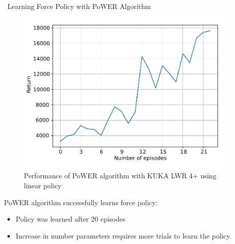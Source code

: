 \documentclass[aspectratio=43,10pt,fleqn,t]{beamer}
\begin{document}
\begin{frame}{~}{\small Learning Force Policy with PoWER Algorithm}
	
	\begin{minipage}[t]{0.51\textwidth}
		\begin{figure}
			\includegraphics[width=0.95\textwidth]{images/exp/cut/power_return2n}
			\caption{\scriptsize Performance of PoWER algorithm with KUKA LWR 4+ using linear policy}
		\end{figure}
	\end{minipage}
	\hfill
	\begin{minipage}[t]{0.47\textwidth}
		\scriptsize
		\vspace{0.5cm}
		PoWER algorithm successfully learns force policy:
		\begin{itemize}
			\scriptsize 
			\item Policy was learned after 20 episodes
			\item Increase in number parameters requires more trials to learn the policy.
		\end{itemize}
	\end{minipage}
\end{frame}
\end{document}
